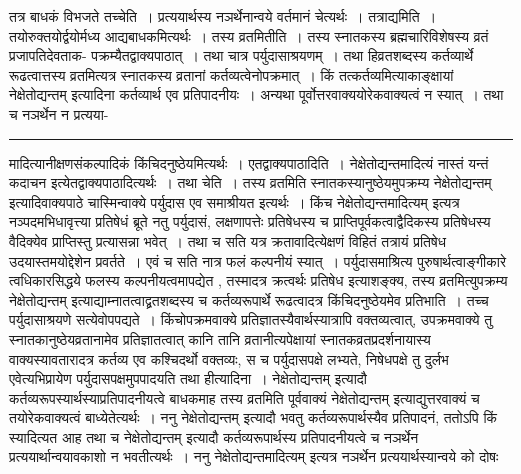 \documentclass[11pt, openany]{book}
\begin{document}
 तत्र बाधकं विभजते {\br तच्चेति~।}  प्रत्ययार्थस्य नञर्थेनान्वये वर्तमानं चेत्यर्थः~। {\br तत्राद्यमिति~।} तयोरुक्तयोर्द्वयोर्मध्य आद्यबाधकमित्यर्थः~। {\br तस्य व्रतमितीति~।} तस्य स्नातकस्य ब्रह्मचारिविशेषस्य व्रतं प्रजापतिदेवताक-
\newpage
\fancyhead[RE]{[ बाधकं\textemdash\ }
{\bl\noindent
पक्रम्यैतद्वाक्यपाठात्~। तथा चात्र पर्युदासाश्रयणम्~। तथा हि\textendash व्रतशब्दस्य कर्तव्यार्थे रूढत्वात्तस्य व्रतमित्यत्र स्नातकस्य व्रतानां कर्तव्यत्वेनोपक्रमात्~। किं तत्कर्तव्यमित्याकाङ्क्षायां {\qtl नेक्षेतोद्यन्तम्}  इत्यादिना कर्तव्यार्थ एव प्रतिपादनीयः~। अन्यथा पूर्वोत्तरवाक्ययोरेकवाक्यत्वं न स्यात्~। तथा च नञर्थेन न प्रत्यया-\\ }
\hrule
\vspace{3mm}
\noindent
मादित्यानीक्षणसंकल्पादिकं किंचिदनुष्ठेयमित्यर्थः~। {\br एतद्वाक्यपाठादिति~।} {\qt नेक्षेतोद्यन्तमादित्यं नास्तं यन्तं कदाचन} इत्येतद्वाक्यपाठादित्यर्थः~। {\br तथा चेति~।} 
तस्य व्रतमिति स्नातकस्यानुष्ठेयमुपक्रम्य {\qt नेक्षेतोद्यन्तम्} इत्यादिवाक्यपाठे चास्मिन्वाक्ये पर्युदास एव समाश्रीयत इत्यर्थः~। किंच {\qt नेक्षेतोद्यन्तमादित्यम्} इत्यत्र 
नञ्पदमभिधावृत्त्या प्रतिषेधं ब्रूते नतु पर्युदासं, लक्षणापत्तेः प्रतिषेधस्य च  प्राप्तिपूर्वकत्वाद्वैदिकस्य प्रतिषेधस्य वैदिक्येव प्राप्तिस्तु प्रत्यासन्ना भवेत्~। तथा च सति यत्र क्रतावादित्येक्षणं विहितं तत्रायं प्रतिषेध उदयास्तमयोद्देशेन प्रवर्तते~। एवं च सति नात्र फलं कल्पनीयं स्यात्~। पर्युदासमाश्रित्य पुरुषार्थत्वाङ्गीकारे त्वधिकारसिद्धये फलस्य कल्पनीयत्वमापद्येत , तस्मादत्र क्रत्वर्थः प्रतिषेध इत्याशङ्क्य, तस्य व्रतमित्युपक्रम्य {\qt नेक्षेतोद्यन्तम्} इत्याद्याम्नातत्वाद्व्रतशब्दस्य च कर्तव्यरूपार्थे रूढत्वादत्र किंचिदनुष्ठेयमेव प्रतिभाति~। तच्च पर्युदासाश्रयणे सत्येवोपपद्यते~। किंचोपक्रमवाक्ये प्रतिज्ञातस्यैवार्थस्यात्रापि वक्तव्यत्वात्, उपक्रमवाक्ये तु स्नातकानुष्ठेयव्रतानामेव प्रतिज्ञातत्वात् कानि तानि व्रतानीत्यपेक्षायां स्नातकव्रतप्रदर्शनायास्य वाक्यस्यावतारादत्र कर्तव्य एव  कश्चिदर्थो वक्तव्यः, स च पर्युदासपक्षे लभ्यते, निषेधपक्षे तु दुर्लभ
एवेत्यभिप्रायेण पर्युदासपक्षमुपपादयति {\br तथा हीत्यादिना~।} {\qt नेक्षेतोद्यन्तम्} इत्यादौ कर्तव्यरूपस्यार्थस्याप्रतिपादनीयत्वे बाधकमाह तस्य व्रतमिति पूर्ववाक्यं {\qt नेक्षेतोद्यन्तम्} इत्याद्युत्तरवाक्यं च तयोरेकवाक्यत्वं बाध्येतेत्यर्थः~। {\br ननु} {\qt नेक्षेतोद्यन्तम्}  इत्यादौ भवतु कर्तव्यरूपार्थस्यैव प्रतिपादनं, ततोऽपि किं स्यादित्यत आह तथा च {\qt नेक्षेतोद्यन्तम्} इत्यादौ कर्तव्यरूपार्थस्य प्रतिपादनीयत्वे च नञर्थेन प्रत्ययार्थान्वयावकाशो न भवतीत्यर्थः~। {\br ननु} {\qt नेक्षेतोद्यन्तमादित्यम्}  इत्यत्र नञर्थेन प्रत्ययार्थस्यान्वये को दोषः 
\end{document}
